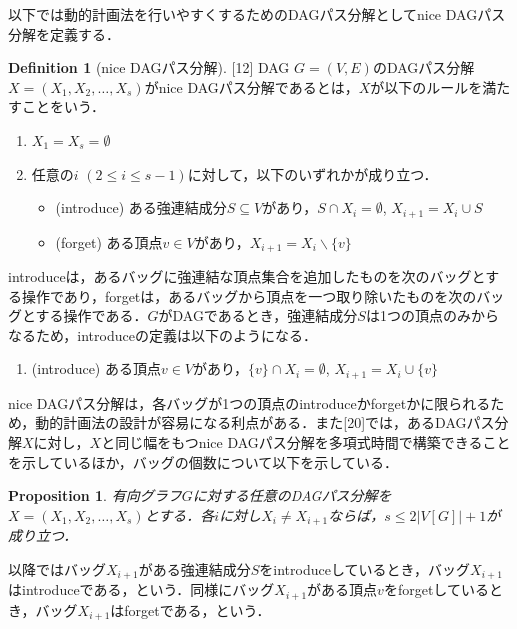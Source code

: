 \documentclass[master]{kuisthesis}		%
\theoremstyle{plain}
\newtheorem{proposition}{Proposition}
\theoremstyle{definition}
\newtheorem{definition*}{Definition}
\begin{document}
以下では動的計画法を行いやすくするためのDAGパス分解としてnice DAGパス分解を定義する．

\begin{definition*}[nice DAGパス分解][12]
    DAG $G=(V, E)$のDAGパス分解$X=(X_1, X_2,  \dots, X_s)$がnice DAGパス分解であるとは，$X$が以下のルールを満たすことをいう．

    \begin{enumerate}
        \item $X_1 = X_s = \emptyset$
        \item 任意の$i$ $(2 \leq i \leq s-1)$に対して，以下のいずれかが成り立つ．
        \begin{itemize}
            \item (introduce) ある強連結成分$S \subseteq V$があり，$S \cap X_i = \emptyset$, $X_{i+1} = X_i \cup S$
            \item (forget) ある頂点$v \in V$があり，$X_{i+1} = X_i \backslash \{v\}$
        \end{itemize}
    \end{enumerate}

\end{definition*}

introduceは，あるバッグに強連結な頂点集合を追加したものを次のバッグとする操作であり，forgetは，あるバッグから頂点を一つ取り除いたものを次のバッグとする操作である．$G$がDAGであるとき，強連結成分$S$は1つの頂点のみからなるため，introduceの定義は以下のようになる．

\begin{enumerate}
    \item (introduce) ある頂点$v \in V$があり，$\{v\} \cap X_i = \emptyset$, $X_{i+1} = X_i \cup \{v\}$
\end{enumerate}

nice DAGパス分解は，各バッグが1つの頂点のintroduceかforgetかに限られるため，動的計画法の設計が容易になる利点がある．また[20]では，あるDAGパス分解$X$に対し，$X$と同じ幅をもつnice DAGパス分解を多項式時間で構築できることを示しているほか，バッグの個数について以下を示している．

\begin{proposition}\label{number_of_bag}
    有向グラフ$G$に対する任意のDAGパス分解を$X=(X_1, X_2, \dots, X_s)$とする．各$i$に対し$X_i \neq X_{i+1}$ならば，$s \leq 2|V[G]|+1$が成り立つ．
\end{proposition}


以降ではバッグ$X_{i+1}$がある強連結成分$S$をintroduceしているとき，バッグ$X_{i+1}$はintroduceである，という．同様にバッグ$X_{i+1}$がある頂点$v$をforgetしているとき，バッグ$X_{i+1}$はforgetである，という．
\end{document}
